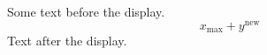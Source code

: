 \documentclass[12pt]{article}
\begin{document}
Some text before the display.
\[ x_{\text{max}} + y^{\text{new}} \]
Text after the display.
\end{document}
